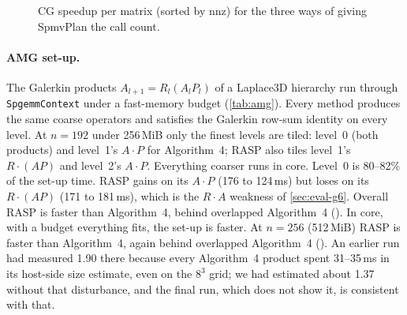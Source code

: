 \begin{table}[t]
\centering\small
\caption{CG time-to-solution (plan + solve) against the same solver with cuSPARSE.}\label{tab:cg}
\end{table}

\begin{figure}[t]
\centering{}
\caption{CG speedup per matrix (sorted by nnz) for the three ways of giving SpmvPlan the call count.}\label{fig:cg}
\end{figure}

\paragraph{AMG set-up.} The Galerkin products $A_{l+1} = R_l(A_lP_l)$ of a Laplace3D hierarchy run through
\texttt{SpgemmContext} under a fast-memory budget (\cref{tab:amg}). Every method produces the same coarse operators
and satisfies the Galerkin row-sum identity on every level.
At $n=192$ under 256\,MiB only the finest levels are tiled: level~0 (both products) and level~1's $A\cdot P$ for
Algorithm~4; RASP also tiles level~1's $R\cdot(AP)$ and level~2's $A\cdot P$. Everything coarser runs in core. Level~0
is 80--82\% of the set-up time. RASP gains on its $A\cdot P$ (176 to 124\,ms) but loses on its $R\cdot(AP)$ (171 to
181\,ms), which is the $R\cdot A$ weakness of \cref{sec:eval-g6}. Overall RASP is \x{}
faster than Algorithm~4, behind overlapped Algorithm~4 (\x). In core,
with a budget everything fits, the set-up is \x{} faster.
At $n=256$ (512\,MiB) RASP is \x{} faster than Algorithm~4, again behind overlapped
Algorithm~4 (\x). An earlier run had measured 1.90\x{} there because every
Algorithm~4 product spent 31--35\,ms in its host-side size estimate, even on the $8^3$ grid; we had estimated about
1.37\x{} without that disturbance, and the final run, which does not show it, is consistent with that.

\begin{table}[t]
\centering\small
\caption{AMG set-up for Laplace3D $n=192$ under a 256\,MiB budget (median of 3).}\label{tab:amg}
\end{table}


